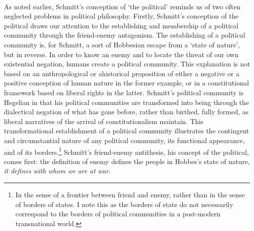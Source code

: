 \documentclass[12pt,a4paper,titlepage]{article}
\begin{document}
\paragraph{}As noted earlier, Schmitt's conception of `the political' reminds us of two often neglected problems in political philosophy. Firstly, Schmitt's conception of the political draws our attention to the establishing and membership of a political community through the friend-enemy antagonism. The establishing of a political community is, for Schmitt, a sort of Hobbesian escape from a `state of nature', but in reverse. In order to know an enemy and to locate the threat of our own existential negation, humans create a political community. This explanation is not based on an anthropological or ahistorical proposition of either a negative or a positive conception of human nature in the former example, or in a constitutional framework based on liberal rights in the latter. Schmitt's political community is Hegelian in that his political communities are transformed into being through the dialectical negation of what has gone before, rather than birthed, fully formed, as liberal narratives of the arrival of constitutionalism maintain. This transformational establishment of a political community illustrates the contingent and circumstantial nature of any political community, its functional appearance, and of its borders.\footnote{In the sense of a frontier between friend and enemy, rather than in the sense of borders of states. I note this as the borders of state do not necessarily correspond to the borders of political communities in a post-modern transnational world.} Schmitt's friend-enemy antithesis, his concept of the political, comes first: the definition of enemy defines the people in Hobbes's state of nature, \emph{it defines with whom we are at war}.
\end{document}
